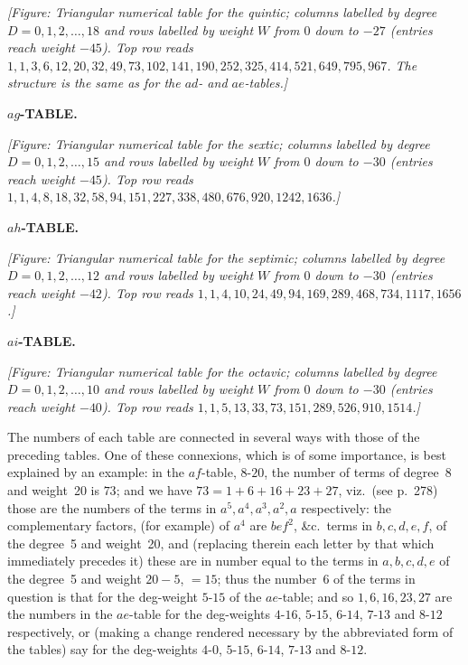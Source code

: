 \documentclass[11pt]{article}
\begin{document}
\medskip
\noindent\textit{[Figure: Triangular numerical table for the quintic; columns labelled by degree $D = 0, 1, 2, \ldots, 18$ and rows labelled by weight $W$ from $0$ down to $-27$ (entries reach weight $-45$). Top row reads $1, 1, 3, 6, 12, 20, 32, 49, 73, 102, 141, 190, 252, 325, 414, 521, 649, 795, 967$. The structure is the same as for the $ad$- and $ae$-tables.]}

\bigskip
\begin{center}\textbf{$ag$-TABLE.}\end{center}

\medskip
\noindent\textit{[Figure: Triangular numerical table for the sextic; columns labelled by degree $D = 0, 1, 2, \ldots, 15$ and rows labelled by weight $W$ from $0$ down to $-30$ (entries reach weight $-45$). Top row reads $1, 1, 4, 8, 18, 32, 58, 94, 151, 227, 338, 480, 676, 920, 1242, 1636$.]}

\bigskip
\begin{center}\textbf{$ah$-TABLE.}\end{center}

\medskip
\noindent\textit{[Figure: Triangular numerical table for the septimic; columns labelled by degree $D = 0, 1, 2, \ldots, 12$ and rows labelled by weight $W$ from $0$ down to $-30$ (entries reach weight $-42$). Top row reads $1, 1, 4, 10, 24, 49, 94, 169, 289, 468, 734, 1117, 1656$.]}

\bigskip
\begin{center}\textbf{$ai$-TABLE.}\end{center}

\medskip
\noindent\textit{[Figure: Triangular numerical table for the octavic; columns labelled by degree $D = 0, 1, 2, \ldots, 10$ and rows labelled by weight $W$ from $0$ down to $-30$ (entries reach weight $-40$). Top row reads $1, 1, 5, 13, 33, 73, 151, 289, 526, 910, 1514$.]}

\medskip
The numbers of each table are connected in several ways with those of the preceding tables. One of these connexions, which is of some importance, is best explained by an example: in the $af$-table, $8$-$20$, the number of terms of degree~8 and weight~20 is $73$; and we have $73 = 1 + 6 + 16 + 23 + 27$, viz.\ (see p.~278) those are the numbers of the terms in $a^5, a^4, a^3, a^2, a$ respectively: the complementary factors, (for example) of $a^4$ are $b e f^2$, \&c.\ terms in $b, c, d, e, f$, of the degree~5 and weight~20, and (replacing therein each letter by that which immediately precedes it) these are in number equal to the terms in $a, b, c, d, e$ of the degree~5 and weight $20 - 5$, $=15$; thus the number~6 of the terms in question is that for the deg-weight $5$-$15$ of the $ae$-table; and so $1, 6, 16, 23, 27$ are the numbers in the $ae$-table for the deg-weights $4$-$16$, $5$-$15$, $6$-$14$, $7$-$13$ and $8$-$12$ respectively, or (making a change rendered necessary by the abbreviated form of the tables) say for the deg-weights $4$-$0$, $5$-$15$, $6$-$14$, $7$-$13$ and $8$-$12$.
\end{document}
